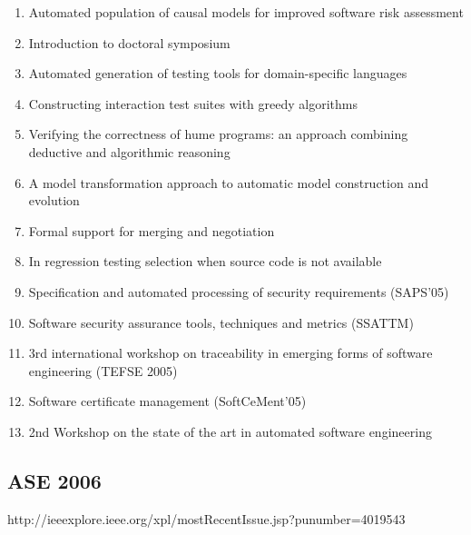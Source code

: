 \begin{enumerate}[itemsep=-1ex]
  \item Automated population of causal models for improved software risk assessment
  \item Introduction to doctoral symposium
  \item Automated generation of testing tools for domain-specific languages
  \item Constructing interaction test suites with greedy algorithms
  \item Verifying the correctness of hume programs: an approach combining deductive and algorithmic reasoning
  \item A model transformation approach to automatic model construction and evolution
  \item Formal support for merging and negotiation
  \item In regression testing selection when source code is not available
  \item Specification and automated processing of security requirements (SAPS'05)
  \item Software security assurance tools, techniques and metrics (SSATTM)
  \item 3rd international workshop on traceability in emerging forms of software engineering (TEFSE 2005)
  \item Software certificate management (SoftCeMent'05)
  \item 2nd Workshop on the state of the art in automated software engineering
\end{enumerate}

\subsection{ASE 2006}

http://ieeexplore.ieee.org/xpl/mostRecentIssue.jsp?punumber=4019543

